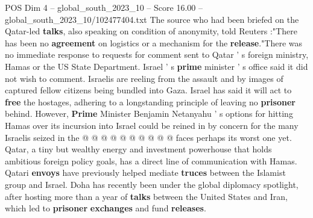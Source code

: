\begin{textsample}{POS Dim 4 – global\_south\_2023\_10 – Score 16.00 – global\_south\_2023\_10/102477404.txt}
The source who had been briefed on the Qatar-led \textbf{talks}, also speaking on condition of anonymity, told Reuters :"There has been no \textbf{agreement} on logistics or a mechanism for the \textbf{release}."There was no immediate response to requests for comment sent to Qatar ' s foreign ministry, Hamas or the US State Department.
Israel ' s \textbf{prime} minister ' s office said it did not wish to comment.
Israelis are reeling from the assault and by images of captured fellow citizens being bundled into Gaza.
Israel has said it will act to \textbf{free} the hostages, adhering to a longstanding principle of leaving no \textbf{prisoner} behind.
However, \textbf{Prime} Minister Benjamin Netanyahu ' s options for hitting Hamas over its incursion into Israel could be reined in by concern for the many Israelis seized in the @ @ @ @ @ @ @ @ @ @ faces perhaps its worst one yet.
Qatar, a tiny but wealthy energy and investment powerhouse that holds ambitious foreign policy goals, has a direct line of communication with Hamas.
Qatari \textbf{envoys} have previously helped mediate \textbf{truces} between the Islamist group and Israel.
Doha has recently been under the global diplomacy spotlight, after hosting more than a year of \textbf{talks} between the United States and Iran, which led to \textbf{prisoner} \textbf{exchanges} and fund \textbf{releases}.

\end{textsample}
